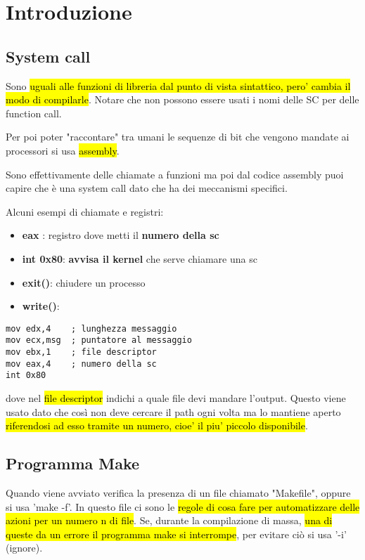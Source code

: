 \newpage
\section{Introduzione}

\subsection{System call}

Sono \hl{uguali alle funzioni di libreria dal punto di vista sintattico, pero' cambia il modo di compilarle}. Notare che non possono essere usati i nomi delle SC per delle function call.

Per poi poter "raccontare" tra umani le sequenze di bit che vengono mandate ai processori si usa \hl{assembly}.

Sono effettivamente delle chiamate a funzioni ma poi dal codice assembly puoi capire che è una system call dato che ha dei meccanismi specifici.

Alcuni esempi di chiamate e registri:
\begin{itemize}
	\item \textbf{eax} : registro dove metti il \textbf{numero della sc}
	\item \textbf{int 0x80}: \textbf{avvisa il kernel} che serve chiamare una sc
	\item \textbf{exit()}: chiudere un processo
	\item \textbf{write()}:
\end{itemize}

\begin{lstlisting}
mov edx,4    ; lunghezza messaggio
mov ecx,msg  ; puntatore al messaggio
mov ebx,1    ; file descriptor
mov eax,4    ; numero della sc
int 0x80	
\end{lstlisting}

dove nel \hl{file descriptor} indichi a quale file devi mandare l'output. Questo viene usato dato che così non deve cercare il path ogni volta ma lo mantiene aperto \hl{riferendosi ad esso tramite un numero, cioe' il piu' piccolo disponibile}.


\subsection{Programma Make}

Quando viene avviato verifica la presenza di un file chiamato "Makefile", oppure si usa 'make -f'. In questo file ci sono le \hl{regole di cosa fare per automatizzare delle azioni per un numero n di file}. Se, durante la compilazione di massa, \hl{una di queste da un errore il programma make si interrompe}, per evitare ciò si usa '-i' (ignore).

